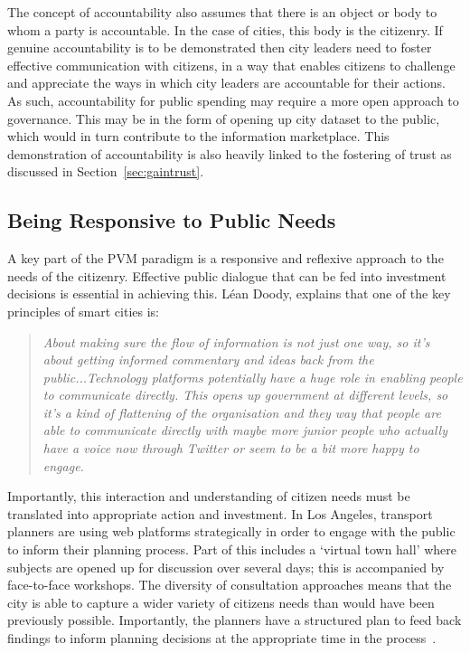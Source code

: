 \documentclass[conference]{IEEEtran}
\begin{document}
The concept of accountability also assumes that there is an object or
body to whom a party is accountable. In the case of cities, this body
is the citizenry. If genuine accountability is to be demonstrated then
city leaders need to foster effective communication with citizens, in
a way that enables citizens to challenge and appreciate the ways in
which city leaders are accountable for their actions. As such,
accountability for public spending may require a more open approach to
governance. This may be in the form of opening up city dataset to the
public, which would in turn contribute to the information
marketplace. This demonstration of accountability is also heavily
linked to the fostering of trust as discussed in Section~\ref{sec:gaintrust}.

\subsection{Being Responsive to Public Needs}
A key part of the PVM paradigm is a responsive and reflexive approach
to the needs of the citizenry. Effective public dialogue that can be
fed into investment decisions is essential in achieving this. L\'{e}an
Doody, explains that one of the key principles of smart cities is:

\begin{quote}
{\emph{About making sure the flow of information is not just one way,
    so it’s about getting informed commentary and ideas back from the
    public...Technology platforms potentially have a huge role in
    enabling people to communicate directly. This opens up government
    at different levels, so it's a kind of flattening of the
    organisation and they way that people are able to communicate
    directly with maybe more junior people who actually have a voice
    now through Twitter or seem to be a bit more happy to engage.}}~\cite{doody:2012}
\end{quote}

Importantly, this interaction and understanding of citizen needs must
be translated into appropriate action and investment. In Los Angeles,
transport planners are using web platforms strategically in order to
engage with the public to inform their planning process. Part of this
includes a `virtual town hall' where subjects are opened up for
discussion over several days; this is accompanied by face-to-face
workshops. The diversity of consultation approaches means that the
city is able to capture a wider variety of citizens needs than would
have been previously possible. Importantly, the planners have a
structured plan to feed back findings to inform planning decisions at
the appropriate time in the process~\cite{la2b:2011}.
\end{document}
